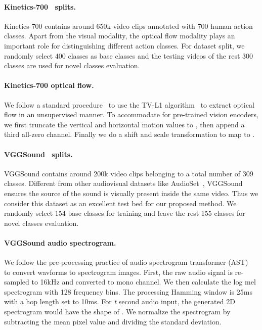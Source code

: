 \documentclass{article}
\begin{document}
\paragraph{Kinetics-700~\cite{carreira2019short} splits.} 
Kinetics-700 contains around 650k video clips annotated with 700 human action classes. Apart from the visual modality, the optical flow modality plays an important role for distinguishing different action classes. 
For dataset split, we randomly select 400 classes as base classes and the testing videos of the rest 300 classes are used for novel classes evaluation. 

\paragraph{Kinetics-700 optical flow.} 
We follow a standard procedure~\cite{xie2018rethinking, han2020memory, han2020self} to use the TV-L1 algorithm~\cite{zach2007duality} to extract optical flow in an unsupervised manner. To accommodate for pre-trained vision encoders, we first truncate the vertical and horizontal motion values to , then append a third all-zero channel. Finally we do a shift and scale transformation to map  to .  

\paragraph{VGGSound~\cite{chen2020vggsound} splits.} VGGSound contains around 200k video clips belonging to a total number of 309 classes. Different from other audiovisual datasets like AudioSet~\cite{gemmeke2017audio}, VGGSound ensures the source of the sound is visually present inside the same video. Thus we consider this dataset as an excellent test bed for our proposed method. 
We randomly select 154 base classes for training and leave the rest 155 classes for novel classes evaluation.

\paragraph{VGGSound audio spectrogram.} 
We follow the pre-processing practice of audio spectrogram transformer (AST)~\cite{gong21ast} to convert wavforms to spectrogram images. First, the raw audio signal is re-sampled to 16kHz and converted to mono channel. We then calculate the log mel spectrogram with 128 frequency bins. The processing Hamming window is 25ms with a hop length set to 10ms. For \emph{t} second audio input, the generated 2D spectrogram would have the shape of . We normalize the spectrogram by subtracting the mean pixel value and dividing the standard deviation. 
\end{document}
